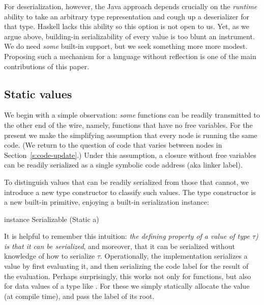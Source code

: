 \documentclass[preprint]{sigplanconf}
\begin{document}
For deserialization, however, the Java approach depends crucially on the \emph{runtime} ability
to take an arbitrary type representation and cough up a deserializer for that type.
Haskell lacks this ability so this option is not open to us.
Yet, as we argue above, building-in serializability of every value is
too blunt an instrument.  We do need \emph{some} built-in support, but
we seek something more more modest.  Proposing such a mechanism for a language without reflection is one of 
the main contributions of this paper.

\subsection{Static values}

We begin with a simple observation: \emph{some} functions can be readily
transmitted to the other end of the wire, namely, functions that have no
free variables.  For the present we make the simplifying assumption that every node is running the same code.  (We return to the question
of code that varies between nodes in Section~\ref{s:code-update}.)
Under this assumption, a closure without free variables can be
readily serialized as a single symbolic code address (aka linker label).

\lstset{mathescape=true}

To distinguish values that can be readily serialized from those that cannot, we introduce a new type constructor
 to classify such values.  The type 
constructor  is a new built-in primitive, 
enjoying a built-in serialization instance:
\begin{code}
  instance Serializable (Static a)
\end{code}
It is helpful to remember this intuition: \emph{the defining property of
a value of type \emph{ $\tau$)} is that it can be serialized},
and moreover, that it can be serialized without knowledge of how to serialize $\tau$.
Operationally, the implementation serializes a  value by first evaluating it,
and then serializing the code label for the result of the evaluation.
Perhaps surprisingly, this works not only for functions, but also for data values of a type like .
For these we simply statically allocate the  value (at compile time), and pass the label of its root.
\end{document}
